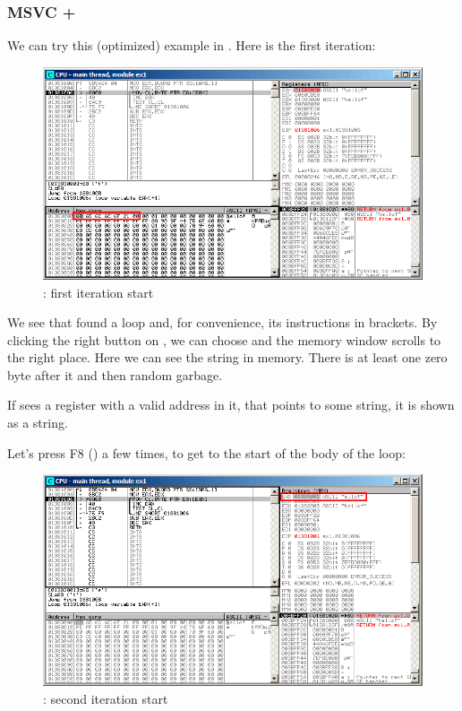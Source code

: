 ﻿\clearpage
\subsubsection{\Optimizing MSVC + \olly}
\myindex{\olly}

We can try this (optimized) example in \olly.  Here is the first iteration:

\begin{figure}[H]
\centering
\includegraphics[scale=\FigScale]{patterns/10_strings/1_strlen/olly1.png}
\caption{\olly: first iteration start}
\label{fig:strlen_olly_1}
\end{figure}

We see that \olly found a loop and, for convenience,  its instructions in brackets.
By clicking the right button on \EAX, we can choose 
 and the memory window scrolls to the right place.
Here we can see the string  in memory.
There is at least
one zero byte after it and then random garbage.

If \olly sees a register with a valid address in it, that points to some string, 
it is shown as a string.

\clearpage
Let's press F8 (\stepover) a few times, to get to the start of the body of the loop:

\begin{figure}[H]
\centering
\includegraphics[scale=\FigScale]{patterns/10_strings/1_strlen/olly2.png}
\caption{\olly: second iteration start}
\label{fig:strlen_olly_2}
\end{figure}

